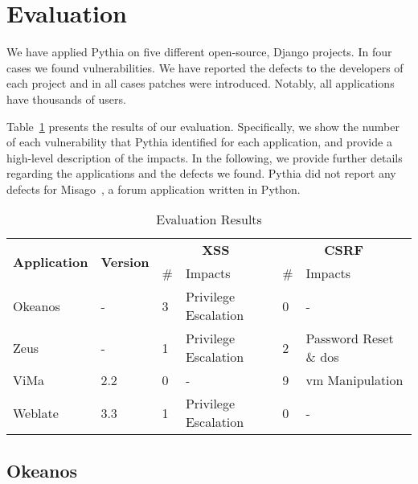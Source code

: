 \section{Evaluation}
\label{sec:eval}

We have applied Pythia on five
different open-source,
Django projects.
In four cases we found vulnerabilities.
We have reported the defects to
the developers of each project and in
all cases patches were introduced.
Notably,
all applications have thousands of users.

Table~\ref{tabular:apps} presents the results
of our evaluation.
Specifically,
we show the number of each vulnerability
that Pythia identified for each application,
and provide a high-level
description of the impacts.
In the following,
we provide further details
regarding the applications and the defects we found.
Pythia did not report any defects for
Misago~\cite{misago},
a forum application written in Python.

\begin{center}
\begin{table}[b]
  \caption{Evaluation Results}
  \vspace{-1.9mm}
  \begin{tabular}{|p{1.8cm}| l | lp{1.6cm}|lp{1.6cm}|}
    \hline
     \multirow{2}{*}{\textbf{Application}} &
        \multirow{2}{*}{\textbf{Version}} &
        \multicolumn{2}{c|}{\textbf{XSS}} &
        \multicolumn{2}{c|}{\textbf{CSRF}} \\ 
        & & {\#} &  {Impacts} & {\#}  & {Impacts} \\ \hline
        Okeanos & - & 3 & Privilege Escalation & 0 & - \\
        \hline
        Zeus & - & 1 & Privilege Escalation & 2 & Password Reset \& {\sc d}o{\sc s}  \\ \hline
        ViMa & 2.2 & 0 & - & 9 & {\sc vm} Manipulation \\ \hline
        Weblate & 3.3 & 1 & Privilege Escalation & 0 & - \\
    \hline
  \end{tabular}
  \label{tabular:apps}
\end{table}

\end{center}

\subsection{Okeanos}
\label{sec:okeanos}

